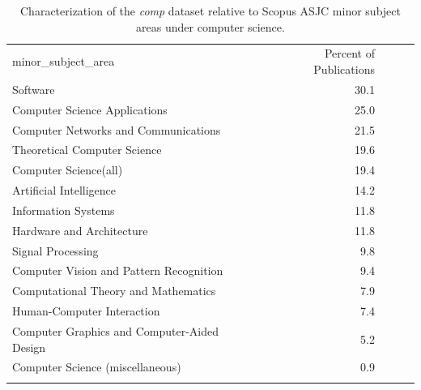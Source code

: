 \begin{table}[ht]
\caption{Characterization of the \emph{comp} dataset relative to Scopus ASJC minor subject areas under computer science.}
\label{tab:comp}       
\begin{tabular}{lrccc}
\hline\noalign{\smallskip}
minor\_subject\_area & Percent of Publications \\
\noalign{\smallskip}\hline\noalign{\smallskip}
Software & 30.1 \\
Computer Science Applications & 25.0 \\ 
Computer Networks and Communications & 21.5 \\
Theoretical Computer Science & 19.6 \\ 
Computer Science(all) & 19.4 \\ 
Artificial Intelligence & 14.2 \\ 
Information Systems & 11.8 \\ 
Hardware and Architecture & 11.8 \\ 
Signal Processing & 9.8 \\ 
Computer Vision and Pattern Recognition & 9.4 \\ 
Computational Theory and Mathematics & 7.9 \\ 
Human-Computer Interaction & 7.4 \\ 
Computer Graphics and Computer-Aided Design & 5.2 \\ 
Computer Science (miscellaneous) & 0.9 \\ 
\noalign{\smallskip}\hline
\end{tabular}
\end{table}
\newpage

